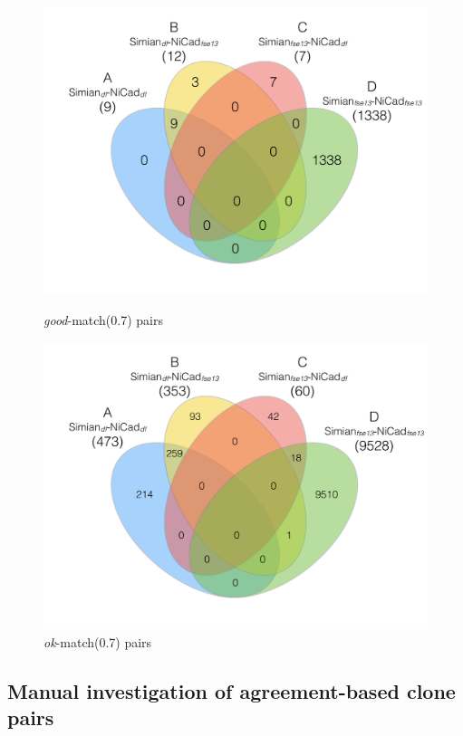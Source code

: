 \documentclass{sig-alternate-05-2015}
\begin{document}
\begin{figure}
	\centering
	\begin{minipage}{.5\textwidth}
		\centering
		\includegraphics[width=0.9\linewidth]{venn4_pairs_good}
		\caption{\textit{good}-match(0.7) pairs}
		\label{fig:venn4_orig_good}
	\end{minipage}%
	\begin{minipage}{.5\textwidth}
		\centering
		\includegraphics[width=0.9\linewidth]{venn4_pairs_ok}
		\caption{\textit{ok}-match(0.7) pairs}
		\label{fig:venn4_orig_ok}
	\end{minipage}
\end{figure}

\subsection{Manual investigation of agreement-based clone pairs}
\end{document}
